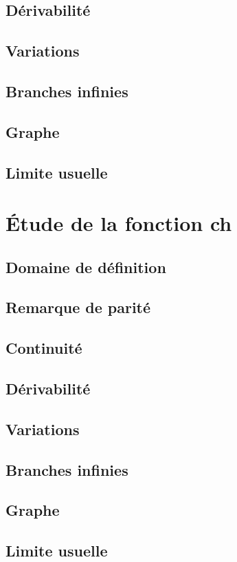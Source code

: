 \documentclass[12pt,a4paper,french]{book}
\begin{document}
		\subsection{Dérivabilité}
		\subsection{Variations}
		\subsection{Branches infinies}
		\subsection{Graphe}
		\subsection{Limite usuelle}
	\section{Étude de la fonction ch}
		\subsection{Domaine de définition}
		\subsection{Remarque de parité}
		\subsection{Continuité}
		\subsection{Dérivabilité}
		\subsection{Variations}
		\subsection{Branches infinies}
		\subsection{Graphe}
		\subsection{Limite usuelle}
\end{document}
